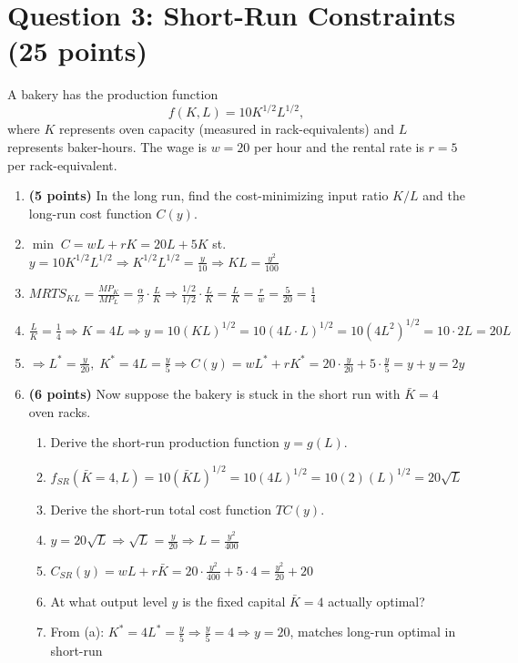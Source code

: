 \documentclass[11pt]{article}
\begin{document}
\section*{Question 3: Short-Run Constraints (25 points)}

A bakery has the production function
\[
f(K,L) = 10K^{1/2}L^{1/2},
\]
where $K$ represents oven capacity (measured in rack-equivalents) and $L$ represents baker-hours. The wage is $w = 20$ per hour and the rental rate is $r = 5$ per rack-equivalent.

\begin{enumerate}[label=(\alph*)]
    \item \textbf{(5 points)} In the long run, find the cost-minimizing input ratio $K/L$ and the long-run cost function $C(y)$.
    \item[] $\min\; C=wL+rK=20L+5K$ st. $y=10K^{1/2}L^{1/2}\Rightarrow K^{1/2}L^{1/2}=\frac{y}{10}\Rightarrow KL=\frac{y^2}{100}$
    \item[] $MRTS_{KL}=\frac{MP_K}{MP_L}=\frac{\alpha}{\beta}\cdot\frac{L}{K}\Rightarrow\frac{1/2}{1/2}\cdot\frac{L}{K}=\frac{L}{K}=\frac{r}{w}=\frac{5}{20}=\frac{1}{4}$
    \item[] $\frac{L}{K}=\frac{1}{4}\Rightarrow K=4L\Rightarrow y=10(KL)^{1/2}=10(4L\cdot L)^{1/2}=10(4L^2)^{1/2}=10\cdot2L=20L$
    \item[] $\Rightarrow L^*=\frac{y}{20},\; K^*=4L=\frac{y}{5}\Rightarrow C(y)=wL^*+rK^*=20\cdot\frac{y}{20}+5\cdot\frac{y}{5}=y+y=2y$

    \item \textbf{(6 points)} Now suppose the bakery is stuck in the short run with $\bar{K} = 4$ oven racks.
    \begin{enumerate}[label=(\roman*)]
        \item Derive the short-run production function $y = g(L)$.
        \item[] $f_{SR}(\bar{K}=4,L)=10(\bar{K}L)^{1/2}=10(4L)^{1/2}=10(2)(L)^{1/2}=20\sqrt{L}$
        \item Derive the short-run total cost function $TC(y)$.
        \item[] $y=20\sqrt{L}\Rightarrow\sqrt{L}=\frac{y}{20}\Rightarrow L=\frac{y^2}{400}$
        \item[] $C_{SR}(y)=wL+r\bar{K}=20\cdot\frac{y^2}{400}+5\cdot 4=\frac{y^2}{20}+20$
        \item At what output level $y$ is the fixed capital $\bar{K} = 4$ actually optimal?
        \item[] From (a): $K^*=4L^*=\frac{y}{5}\Rightarrow\frac{y}{5}=4\Rightarrow y=20$, matches long-run optimal in short-run
    \end{enumerate}


\end{enumerate}
\end{document}
